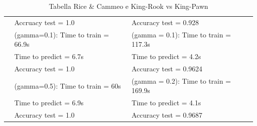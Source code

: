 \documentclass{article}
\begin{document}
\begin{table}[htbp]
\begin{adjustbox}{width=\textwidth}
\begin{tabularx}{\textwidth}{|>{\centering\arraybackslash}X|>{\centering\arraybackslash}X|>{\centering\arraybackslash}X|}
	  & Accruacy test = 1.0 & Accuracy test = 0.928\\
	  & (gamma=0.1): Time  to train = 66.9s & (gamma = 0.1): Time  to train = 117.3s\\
	  & Time  to predict = 6.7s & Time  to predict = 4.2s\\
	  & Accuracy test = 1.0 & Accuracy test = 0.9624\\
	  & (gamma=0.5): Time  to train = 60s & (gamma = 0.2): Time  to train = 169.9s\\
	  & Time  to predict = 6.9s & Time  to predict = 4.1s\\
	  & Accuracy test = 1.0 & Accuracy test = 0.9687\\
	  \hline
	  \end{tabularx}
    \end{adjustbox}
	\caption{Tabella Rice \& Cammeo e King-Rook vs King-Pawn}
  \end{table}
\end{document}
